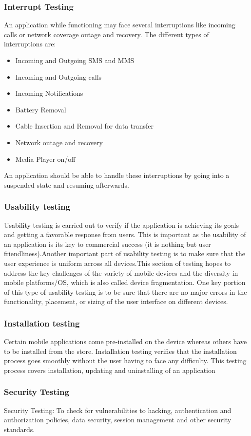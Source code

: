 \documentclass[BTech]{srmuthesis}
\begin{document}
\subsubsection{Interrupt Testing}
 An application while functioning may face several interruptions like incoming calls or network coverage outage and recovery. The different types of interruptions are:
\begin{itemize}
\item Incoming and Outgoing SMS and MMS
\item Incoming and Outgoing calls
\item Incoming Notifications
\item Battery Removal
\item Cable Insertion and Removal for data transfer
\item Network outage and recovery
\item Media Player on/off
\end{itemize}
An application should be able to handle these interruptions by going into a suspended state and resuming afterwards.
\subsubsection{Usability testing}
Usability testing is carried out to verify if the application is achieving its goals and getting a favorable response from users. This is important as the usability of an application is its key to commercial success (it is nothing but user friendliness).Another important part of usability testing is to make sure that the user experience is uniform across all devices.This section of testing hopes to address the key challenges of the variety of mobile devices and the diversity in mobile platforms/OS, which is also called device fragmentation. One key portion of this type of usability testing is to be sure that there are no major errors in the functionality, placement, or sizing of the user interface on different devices.
\subsubsection{Installation testing}
Certain mobile applications come pre-installed on the device whereas others have to be installed from the store. Installation testing verifies that the installation process goes smoothly without the user having to face any difficulty. This testing process covers installation, updating and uninstalling of an application
\subsubsection{Security Testing}
Security Testing: To check for vulnerabilities to hacking, authentication and authorization policies, data security, session management and other security standards.
\end{document}
